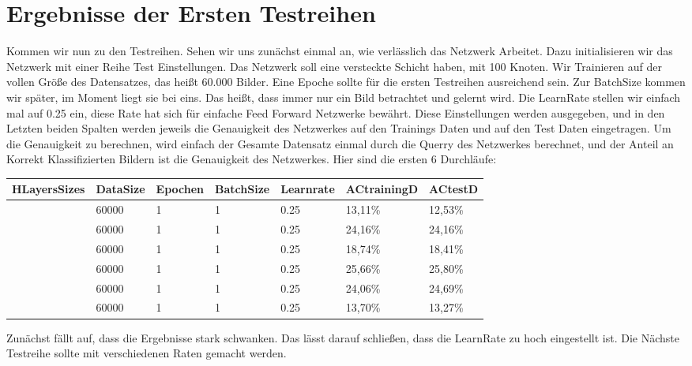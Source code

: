 \documentclass[12pt]{article}
\begin{document}
\section{ Ergebnisse der Ersten Testreihen}
Kommen wir nun zu den Testreihen. Sehen wir uns zunächst einmal an, wie verlässlich das Netzwerk Arbeitet. Dazu initialisieren wir das Netzwerk mit einer Reihe Test Einstellungen. Das Netzwerk soll eine versteckte Schicht haben, mit 100 Knoten. Wir Trainieren auf der vollen Größe des Datensatzes, das heißt 60.000 Bilder. Eine Epoche sollte für die ersten Testreihen ausreichend sein. Zur BatchSize kommen wir später, im Moment liegt sie bei eins. Das heißt, dass immer nur ein Bild betrachtet und gelernt wird. Die LearnRate stellen wir einfach mal auf 0.25 ein, diese Rate hat sich für einfache Feed Forward Netzwerke bewährt. Diese Einstellungen werden ausgegeben, und in den Letzten beiden Spalten werden jeweils die Genauigkeit des Netzwerkes auf den Trainings Daten und auf den Test Daten eingetragen. Um die Genauigkeit zu berechnen, wird einfach der Gesamte Datensatz einmal durch die Querry des Netzwerkes berechnet, und der Anteil an Korrekt Klassifizierten Bildern ist die Genauigkeit des Netzwerkes.
Hier sind die ersten 6 Durchläufe:
\begin{table}[H]
    \centering
    \begin{tabular}{|l|l|l|l|l|l|l|}
    \hline
        HLayersSizes & DataSize & Epochen & BatchSize & Learnrate & ACtrainingD & ACtestD \\ \hline
        [780, 100, 10] & 60000 & 1 & 1 & 0.25 & 13,11\% & 12,53\% \\ \hline
        [780, 100, 10] & 60000 & 1 & 1 & 0.25 & 24,16\% & 24,16\% \\ \hline
        [780, 100, 10] & 60000 & 1 & 1 & 0.25 & 18,74\% & 18,41\% \\ \hline
        [780, 100, 10] & 60000 & 1 & 1 & 0.25 & 25,66\% & 25,80\% \\ \hline
        [780, 100, 10] & 60000 & 1 & 1 & 0.25 & 24,06\% & 24,69\% \\ \hline
        [780, 100, 10] & 60000 & 1 & 1 & 0.25 & 13,70\% & 13,27\% \\ \hline
    \end{tabular}
\end{table}
Zunächst fällt auf, dass die Ergebnisse stark schwanken. Das lässt darauf schließen, dass die LearnRate zu hoch eingestellt ist. Die Nächste Testreihe sollte mit verschiedenen Raten gemacht werden.
\end{document}
